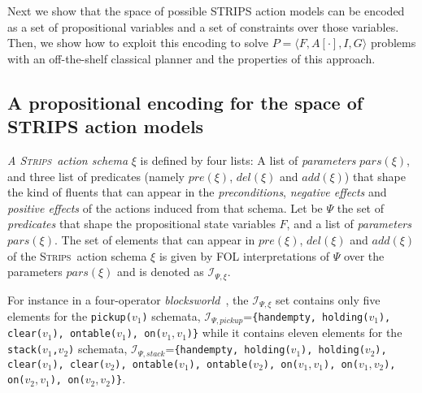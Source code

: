 \documentclass{article}
\newcommand{\tup}[1]{{\langle #1 \rangle}}
\newcommand{\strips}{\textsc{Strips}}
\begin{document}
Next we show that the space of possible STRIPS action models can be encoded as a set of propositional variables and a set of constraints over those variables. Then, we show how to exploit this encoding to solve $P=\tup{F,A[\cdot],I,G}$ problems with an off-the-shelf classical planner and the properties of this approach.


\subsection{A propositional encoding for the space of STRIPS action models}
{\em A \strips\ action schema} $\xi$ is defined by four lists: A list of {\em parameters} $pars(\xi)$, and three list of predicates (namely $pre(\xi)$, $del(\xi)$ and $add(\xi)$) that shape the kind of fluents that can appear in the {\em preconditions}, {\em negative effects} and {\em positive effects} of the actions induced from that schema. Let be $\Psi$ the set of {\em predicates} that shape the propositional state variables $F$, and a list of {\em parameters} $pars(\xi)$. The set of elements that can appear in $pre(\xi)$, $del(\xi)$ and $add(\xi)$ of the \strips\ action schema $\xi$ is given by FOL interpretations of $\Psi$ over the parameters $pars(\xi)$ and is denoted as ${\mathcal I}_{\Psi,\xi}$.

For instance in a four-operator {\em blocksworld}~\cite{slaney2001blocks}, the ${\mathcal I}_{\Psi,\xi}$ set contains only five elements for the {\small \tt pickup($v_1$)} schemata, ${\mathcal I}_{\Psi,pickup}$={\small\tt\{handempty, holding($v_1$), clear($v_1$), ontable($v_1$), on($v_1,v_1$)\}} while it contains eleven elements for the {\small \tt stack($v_1$,$v_2$)} schemata, ${\mathcal I}_{\Psi,stack}$={\small\tt\{handempty, holding($v_1$), holding($v_2$), clear($v_1$), clear($v_2$), ontable($v_1$), ontable($v_2$), on($v_1,v_1$), on($v_1,v_2$), on($v_2,v_1$), on($v_2,v_2$)\}}. 
\end{document}
